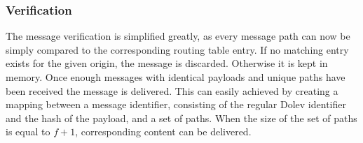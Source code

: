 



\subsubsection{Verification}


The message verification is simplified greatly, as every message path can now be simply compared to the corresponding routing table entry. If no matching entry exists for the given origin, the message is discarded. Otherwise it is kept in memory. Once enough messages with identical payloads and unique paths have been received the message is delivered. This can easily achieved by creating a mapping between a message identifier, consisting of the regular Dolev identifier and the hash of the payload, and a set of paths. When the size of the set of paths is equal to $f+1$, corresponding content can be delivered.


